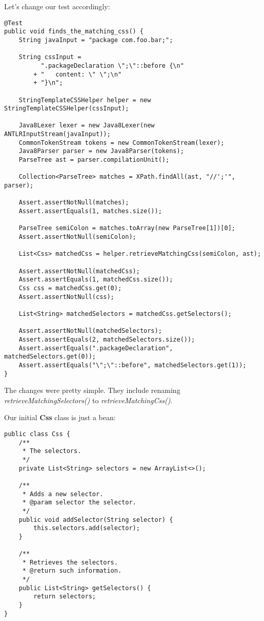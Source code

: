 \documentclass[11pt]{article}
\begin{document}
Let's change our test accordingly:

\begin{verbatim}
@Test
public void finds_the_matching_css() {
    String javaInput = "package com.foo.bar;";

    String cssInput =
          ".packageDeclaration \";\"::before {\n"
        + "   content: \" \";\n"
        + "}\n";

    StringTemplateCSSHelper helper = new StringTemplateCSSHelper(cssInput);

    Java8Lexer lexer = new Java8Lexer(new ANTLRInputStream(javaInput));
    CommonTokenStream tokens = new CommonTokenStream(lexer);
    Java8Parser parser = new Java8Parser(tokens);
    ParseTree ast = parser.compilationUnit();

    Collection<ParseTree> matches = XPath.findAll(ast, "//';'", parser);

    Assert.assertNotNull(matches);
    Assert.assertEquals(1, matches.size());

    ParseTree semiColon = matches.toArray(new ParseTree[1])[0];
    Assert.assertNotNull(semiColon);

    List<Css> matchedCss = helper.retrieveMatchingCss(semiColon, ast);

    Assert.assertNotNull(matchedCss);
    Assert.assertEquals(1, matchedCss.size());
    Css css = matchedCss.get(0);
    Assert.assertNotNull(css);

    List<String> matchedSelectors = matchedCss.getSelectors();

    Assert.assertNotNull(matchedSelectors);
    Assert.assertEquals(2, matchedSelectors.size());
    Assert.assertEquals(".packageDeclaration", matchedSelectors.get(0));
    Assert.assertEquals("\";\"::before", matchedSelectors.get(1));
}
\end{verbatim}

The changes were pretty simple. They include renaming \emph{retrieveMatchingSelectors()} to \emph{retrieveMatchingCss()}.

Our initial \textbf{Css} class is just a bean:

\begin{verbatim}
public class Css {
    /**
     * The selectors.
     */
    private List<String> selectors = new ArrayList<>();

    /**
     * Adds a new selector.
     * @param selector the selector.
     */
    public void addSelector(String selector) {
        this.selectors.add(selector);
    }

    /**
     * Retrieves the selectors.
     * @return such information.
     */
    public List<String> getSelectors() {
        return selectors;
    }
}
\end{verbatim}
\end{document}
